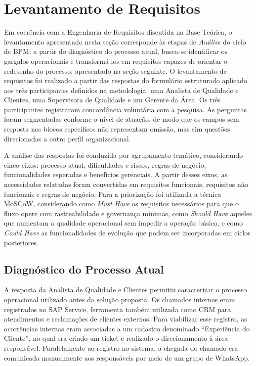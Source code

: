 \section{Levantamento de Requisitos}

Em coerência com a Engenharia de Requisitos discutida na Base
Teórica, o levantamento apresentado nesta seção corresponde
às etapas de \textit{Análise} do ciclo de BPM: a partir do
diagnóstico do processo atual, busca-se identificar os
gargalos operacionais e transformá-los em requisitos capazes
de orientar o redesenho do processo, apresentado na seção
seguinte. O levantamento de requisitos foi realizado a partir
das respostas do formulário estruturado aplicado aos três
participantes definidos na metodologia: uma Analista de
Qualidade e Clientes, uma Supervisora de Qualidade e um
Gerente da Área. Os três participantes registraram
concordância voluntária com a pesquisa. As perguntas foram
segmentadas conforme o nível de atuação, de modo que os
campos sem resposta nos blocos específicos não representam
omissão, mas sim questões direcionadas a outro perfil
organizacional.

A análise das respostas foi conduzida por agrupamento
temático, considerando cinco eixos: processo atual,
dificuldades e riscos, regras de negócio, funcionalidades
esperadas e benefícios gerenciais. A partir desses eixos,
as necessidades relatadas foram convertidas em requisitos
funcionais, requisitos não funcionais e regras de negócio.
Para a priorização foi utilizada a técnica MoSCoW,
considerando como \textit{Must Have} os requisitos
necessários para que o fluxo opere com rastreabilidade e
governança mínimas, como \textit{Should Have} aqueles que
aumentam a qualidade operacional sem impedir a operação
básica, e como \textit{Could Have} as funcionalidades de
evolução que podem ser incorporadas em ciclos posteriores.

\subsection{Diagnóstico do Processo Atual}

A resposta da Analista de Qualidade e Clientes permitiu
caracterizar o processo operacional utilizado antes da
solução proposta. Os chamados internos eram registrados no
SAP Service, ferramenta também utilizada como CRM para
atendimentos e reclamações de clientes externos. Para
viabilizar esse registro, as ocorrências internas eram
associadas a um cadastro denominado ``Experiência do
Cliente'', no qual era criado um ticket e realizado o
direcionamento à área responsável. Paralelamente ao registro
no sistema, a chegada do chamado era comunicada manualmente
aos responsáveis por meio de um grupo de WhatsApp.

